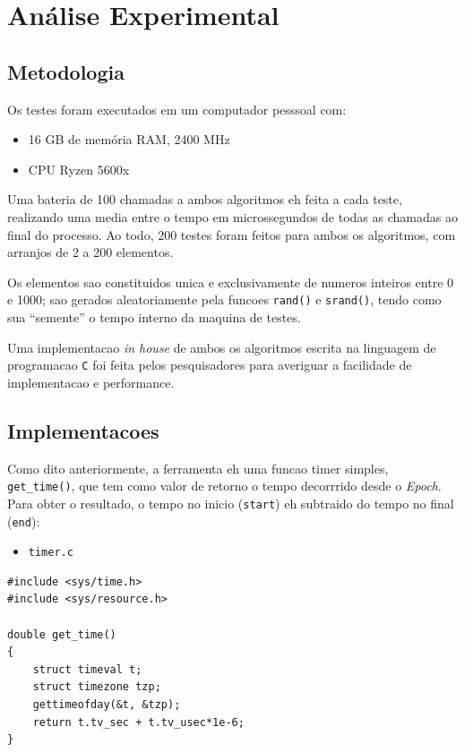 \documentclass{article}
\begin{document}
\section{Análise Experimental}

\subsection{Metodologia}

Os testes foram executados em um computador pesssoal com:
\begin{itemize}
  \item{16 GB de memória RAM, 2400 MHz}
  \item{CPU Ryzen 5600x}
\end{itemize}
Uma bateria de 100 chamadas a ambos algoritmos eh feita a cada teste, realizando uma media entre o tempo em microssegundos de todas as chamadas ao final do processo. Ao todo, 200 testes foram feitos para ambos os algoritmos, com arranjos de 2 a 200 elementos.

Os elementos sao constituidos unica e exclusivamente de numeros inteiros entre 0 e 1000; sao gerados aleatoriamente pela funcoes \texttt{rand()} e \texttt{srand()}, tendo como sua ``semente'' o tempo interno da maquina de testes.

Uma implementacao \textit{in house} de ambos os algoritmos escrita na linguagem de programacao \texttt{C} foi feita pelos pesquisadores para averiguar a facilidade de implementacao e performance.

\subsection{Implementacoes}

Como dito anteriormente, a ferramenta eh uma funcao timer simples, \texttt{get\_time()}, que tem como valor de retorno o tempo decorrrido desde o \textit{Epoch}. Para obter o resultado, o tempo no inicio (\texttt{start}) eh subtraido do tempo no final (\texttt{end}):

\begin{itemize}
  \item{\texttt{timer.c}}
\end{itemize}
\begin{verbatim}
#include <sys/time.h>
#include <sys/resource.h>

double get_time()
{
    struct timeval t;
    struct timezone tzp;
    gettimeofday(&t, &tzp);
    return t.tv_sec + t.tv_usec*1e-6;
}
\end{verbatim}
\end{document}
